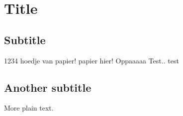 \documentclass{article}
\begin{document}
\section{Title}

\subsection{Subtitle}

1234 hoedje van papier!
papier hier!
Oppaaaaa
Test.. test
\subsection{Another subtitle}

More plain text.
\end{document}
